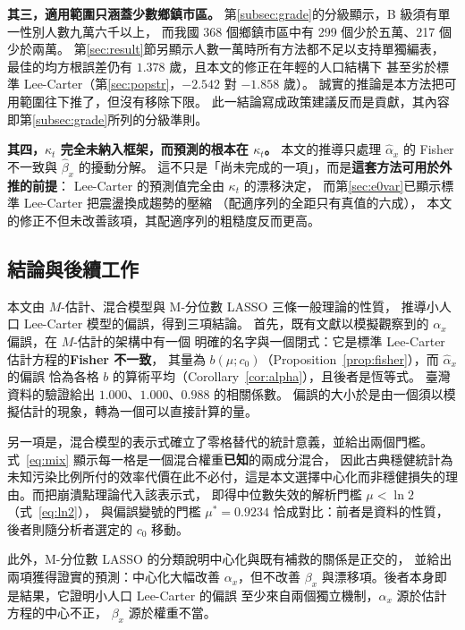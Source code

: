 \documentclass[UTF8, fontset=macnew, a4paper, 12pt]{ctexart}
\begin{document}
\textbf{其三，適用範圍只涵蓋少數鄉鎮市區。}
第\ref{subsec:grade}的分級顯示，B 級須有單一性別人數九萬六千以上，
而我國 368 個鄉鎮市區中有 299 個少於五萬、217 個少於兩萬。
第\ref{sec:result}節另顯示人數一萬時所有方法都不足以支持單獨編表，
最佳的均方根誤差仍有 $1.378$ 歲，且本文的修正在年輕的人口結構下
甚至劣於標準 Lee-Carter（第\ref{sec:popstr}，$-2.542$ 對 $-1.858$ 歲）。
誠實的推論是本方法把可用範圍往下推了，但沒有移除下限。
此一結論寫成政策建議反而是貢獻，其內容即第\ref{subsec:grade}所列的分級準則。

\textbf{其四，$\kappa_t$ 完全未納入框架，而預測的根本在 $\kappa_t$。}
本文的推導只處理 $\hat\alpha_x$ 的 Fisher 不一致與 $\hat\beta_x$ 的擾動分解。
這不只是「尚未完成的一項」，而是\textbf{這套方法可用於外推的前提}：
Lee-Carter 的預測值完全由 $\kappa_t$ 的漂移決定，
而第\ref{sec:e0var}已顯示標準 Lee-Carter 把震盪換成趨勢的壓縮
（配適序列的全距只有真值的六成），
本文的修正不但未改善該項，其配適序列的粗糙度反而更高。

\subsection{結論與後續工作}\label{subsec:concl}\label{subsec:future}

本文由 $M$-估計、混合模型與 M-分位數 LASSO 三條一般理論的性質，
推導小人口 Lee-Carter 模型的偏誤，得到三項結論。
首先，既有文獻以模擬觀察到的 $\alpha_x$ 偏誤，在 $M$-估計的架構中有一個
明確的名字與一個閉式：它是標準 Lee-Carter 估計方程的\textbf{Fisher 不一致}，
其量為 $b(\mu;c_0)$（Proposition~\ref{prop:fisher}），而 $\hat\alpha_x$ 的偏誤
恰為各格 $b$ 的算術平均（Corollary~\ref{cor:alpha}），且後者是恆等式。
臺灣資料的驗證給出 $1.000$、$1.000$、$0.988$ 的相關係數。
偏誤的大小於是由一個須以模擬估計的現象，轉為一個可以直接計算的量。

另一項是，混合模型的表示式確立了零格替代的統計意義，並給出兩個門檻。
式~\eqref{eq:mix} 顯示每一格是一個混合權重\textbf{已知}的兩成分混合，
因此古典穩健統計為未知污染比例所付的效率代價在此不必付，這是本文選擇中心化而非穩健損失的理由。而把崩潰點理論代入該表示式，
即得中位數失效的解析門檻 $\mu<\ln2$（式~\eqref{eq:ln2}），
與偏誤變號的門檻 $\mu^\ast=0.9234$ 恰成對比：前者是資料的性質，
後者則隨分析者選定的 $c_0$ 移動。

此外，M-分位數 LASSO 的分類說明中心化與既有補救的關係是正交的，
並給出兩項獲得證實的預測：中心化大幅改善 $\alpha_x$，但不改善
$\beta_x$ 與漂移項。後者本身即是結果，它證明小人口 Lee-Carter 的偏誤
至少來自兩個獨立機制，$\alpha_x$ 源於估計方程的中心不正，
$\beta_x$ 源於權重不當。
\end{document}

